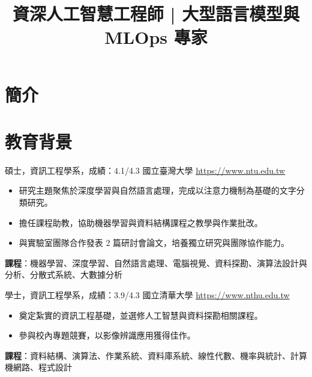 \documentclass[a4paper, serif, 10pt]{moderncv}
\title{資深人工智慧工程師 | 大型語言模型與 MLOps 專家}
\begin{document}
\maketitle

\section{簡介}

\section{教育背景}

        {碩士，資訊工程學系，成績：4.1/4.3}
        {國立臺灣大學}
        {\url{https://www.ntu.edu.tw}}
        {}
        {\begin{itemize}
\item 研究主題聚焦於深度學習與自然語言處理，完成以注意力機制為基礎的文字分類研究。
\item 擔任課程助教，協助機器學習與資料結構課程之教學與作業批改。
\item 與實驗室團隊合作發表 2 篇研討會論文，培養獨立研究與團隊協作能力。
\end{itemize}
\textbf{課程}：機器學習、深度學習、自然語言處理、電腦視覺、資料探勘、演算法設計與分析、分散式系統、大數據分析}

        {學士，資訊工程學系，成績：3.9/4.3}
        {國立清華大學}
        {\url{https://www.nthu.edu.tw}}
        {}
        {\begin{itemize}
\item 奠定紮實的資訊工程基礎，並選修人工智慧與資料探勘相關課程。
\item 參與校內專題競賽，以影像辨識應用獲得佳作。
\end{itemize}
\textbf{課程}：資料結構、演算法、作業系統、資料庫系統、線性代數、機率與統計、計算機網路、程式設計}
\end{document}
